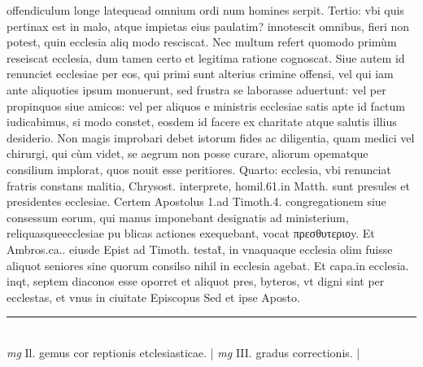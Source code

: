 \documentclass{article}
\begin{document}
\begin{pages}
offendiculum longe latequead omnium ordi num homines serpit. Tertio: vbi quis pertinax est in malo, atque  impietas eius paulatim? innotescit omnibus, fieri non potest, quin ecclesia aliq modo resciscat. Nec multum refert quomodo primùm reseiscat ecclesia, dum tamen certo et legitima ratione cognoscat. Siue autem id renunciet ecclesiae per eos, qui primi sunt alterius crimine offensi, vel qui iam ante aliquoties ipsum monuerunt, sed frustra se laborasse aduertunt: vel per propinquos siue amicos: vel per aliquos e ministris ecclesiae satis apte id factum iudicabimus, si modo constet, eosdem id facere ex charitate atque  salutis illius desiderio. Non magis improbari debet istorum fides ac diligentia, quam medici vel chirurgi, qui cùm videt, se aegrum non posse curare, aliorum opematque  consilium implorat, quos nouit esse peritiores. Quarto: ecclesia, vbi renunciat fratris constans malitia, Chrysost. interprete, homil.61.in Matth. sunt presules et presidentes ecclesiae. Certem Apostolus 1.ad Timoth.4. congregationem siue consessum eorum, qui manus imponebant designatis ad ministerium, reliquasqueecclesiae pu blicas actiones exequebant, vocat πρεσθυτεριοy. Et Ambros.ca.. eiusde Epist ad Timoth. testat̃, in vnaquaque  ecclesia olim fuisse aliquot seniores sine quorum consilso nihil in ecclesia agebat. Et capa.in ecclesia. inqt, septem diaconos esse oporret et aliquot pres, byteros, vt digni sint per ecclestas, et vnus in ciuitate Episcopus Sed et ipse Aposto.  \pend
\vspace{0.5cm}\noindent
\vspace{0.2cm}\rule{1cm}{0.2pt}\\ 
\hspace{0.2cm}\textit{mg}
\footnotesize Il. gemus cor reptionis etclesiasticae. 
\normalsize| 
\hspace{0.2cm}\textit{mg}
\footnotesize III. gradus correctionis. 
\normalsize| 

\end{pages}
\end{document}

